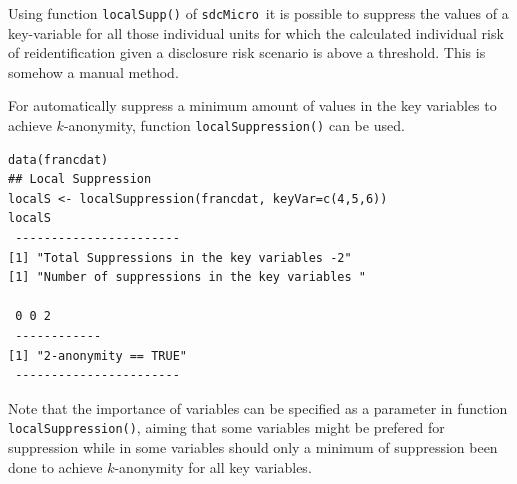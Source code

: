 \documentclass[12pt]{article}
\newcommand{\sdcMicro}{\texttt{sdcMicro}}
\begin{document}
Using function \lstinline{localSupp()} of \sdcMicro~it is possible to
 suppress the values of a key-variable for all those individual units for which the calculated individual 
risk of reidentification given a disclosure risk scenario is above a threshold. 
This is somehow a manual method.

For automatically suppress a minimum amount of values in the key variables to achieve $k$-anonymity, function
\lstinline{localSuppression()} can be used.


\begin{lstlisting}[captionpos=b, caption={Local Suppression to achieve k-anonymity.}, label=listingGR]
data(francdat)
## Local Suppression            
localS <- localSuppression(francdat, keyVar=c(4,5,6))
localS
 -----------------------
[1] "Total Suppressions in the key variables -2"
[1] "Number of suppressions in the key variables "

 0 0 2 
 ------------
[1] "2-anonymity == TRUE"
 -----------------------
\end{lstlisting}

Note that the importance of variables can be specified as a parameter in function
\lstinline{localSuppression()}, aiming that some variables might be
prefered for suppression while in some variables should only a minimum of
suppression been done to achieve $k$-anonymity for all key variables.
\end{document}
